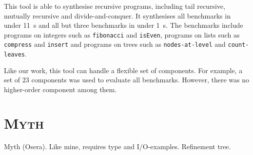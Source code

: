 This tool is able to synthesise recursive programs, including tail recursive, mutually recursive and divide-and-conquer. It synthesises all benchmarks in under \SI{11}{s} and all but three benchmarks in under \SI{1}{s}. The benchmarks include programs on integers such as \lstinline!fibonacci! and \lstinline!isEven!, programs on lists such as \lstinline!compress! and \lstinline!insert! and programs on trees such as \lstinline!nodes-at-level! and \lstinline!count-leaves!.

Like our work, this tool can handle a flexible set of components. For example, a set of $23$ components was used to evaluate all benchmarks. However, there was no higher-order component among them.

\section{\mdseries\textsc{Myth}}
Myth (Osera). Like mine, requires type and I/O-examples. Refinement tree.
